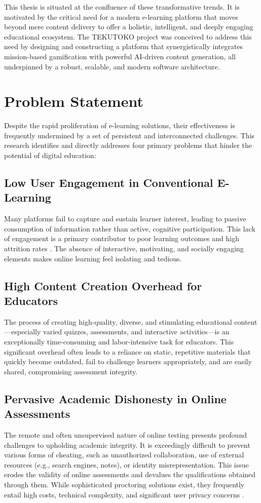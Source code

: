 This thesis is situated at the confluence of these transformative trends. It is motivated by the critical need for a modern e-learning platform that moves beyond mere content delivery to offer a holistic, intelligent, and deeply engaging educational ecosystem. The TEKUTOKO project was conceived to address this need by designing and constructing a platform that synergistically integrates mission-based gamification with powerful AI-driven content generation, all underpinned by a robust, scalable, and modern software architecture.

\section{Problem Statement}
\label{sec:intro_problem}
Despite the rapid proliferation of e-learning solutions, their effectiveness is frequently undermined by a set of persistent and interconnected challenges. This research identifies and directly addresses four primary problems that hinder the potential of digital education:

\subsection{Low User Engagement in Conventional E-Learning}
Many platforms fail to capture and sustain learner interest, leading to passive consumption of information rather than active, cognitive participation. This lack of engagement is a primary contributor to poor learning outcomes and high attrition rates \citep{fredricks2004}. The absence of interactive, motivating, and socially engaging elements makes online learning feel isolating and tedious.

\subsection{High Content Creation Overhead for Educators}
The process of creating high-quality, diverse, and stimulating educational content—especially varied quizzes, assessments, and interactive activities—is an exceptionally time-consuming and labor-intensive task for educators. This significant overhead often leads to a reliance on static, repetitive materials that quickly become outdated, fail to challenge learners appropriately, and are easily shared, compromising assessment integrity.

\subsection{Pervasive Academic Dishonesty in Online Assessments}
The remote and often unsupervised nature of online testing presents profound challenges to upholding academic integrity. It is exceedingly difficult to prevent various forms of cheating, such as unauthorized collaboration, use of external resources (e.g., search engines, notes), or identity misrepresentation. This issue erodes the validity of online assessments and devalues the qualifications obtained through them. While sophisticated proctoring solutions exist, they frequently entail high costs, technical complexity, and significant user privacy concerns \citep{ullah2021}.

